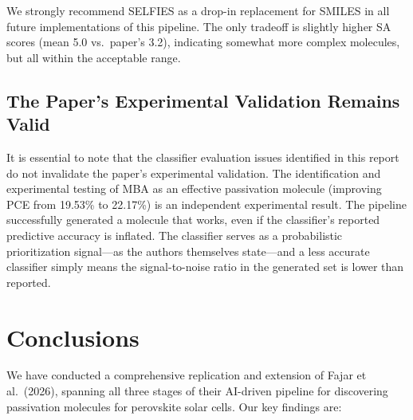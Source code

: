 \documentclass[11pt,a4paper]{article}
\begin{document}
We strongly recommend SELFIES as a drop-in replacement for SMILES in all future implementations of this pipeline. The only tradeoff is slightly higher SA scores (mean 5.0 vs.\ paper's 3.2), indicating somewhat more complex molecules, but all within the acceptable range.

\subsection{The Paper's Experimental Validation Remains Valid}

It is essential to note that the classifier evaluation issues identified in this report do not invalidate the paper's experimental validation. The identification and experimental testing of MBA as an effective passivation molecule (improving PCE from 19.53\% to 22.17\%) is an independent experimental result. The pipeline successfully generated a molecule that works, even if the classifier's reported predictive accuracy is inflated. The classifier serves as a probabilistic prioritization signal---as the authors themselves state---and a less accurate classifier simply means the signal-to-noise ratio in the generated set is lower than reported.

\section{Conclusions}
\label{sec:conclusions}

We have conducted a comprehensive replication and extension of Fajar et al.\ (2026), spanning all three stages of their AI-driven pipeline for discovering passivation molecules for perovskite solar cells. Our key findings are:
\end{document}
